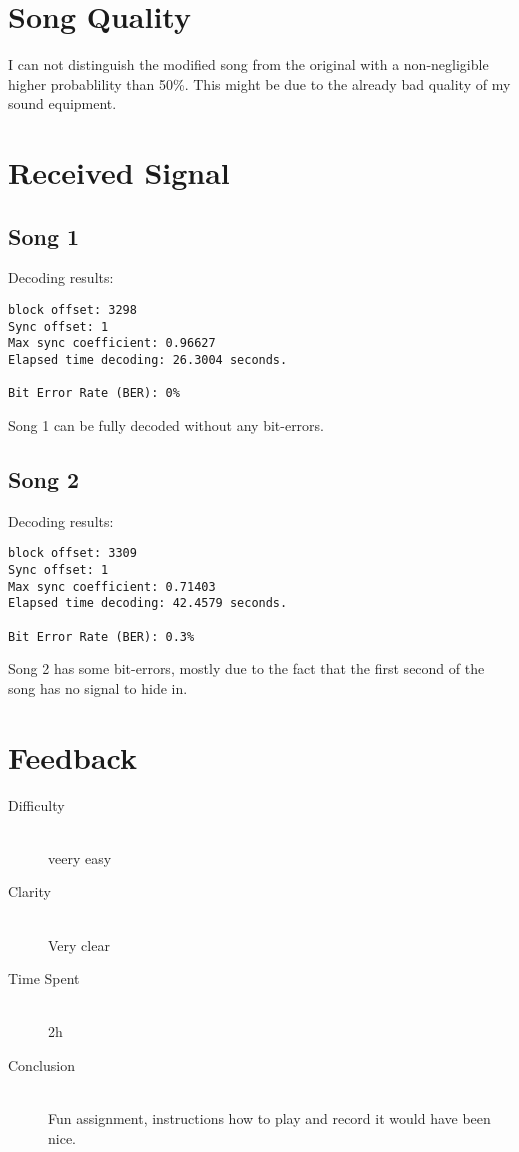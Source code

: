 \documentclass[12pt]{article}
\begin{document}
\section{Song Quality}
I can not distinguish the modified song from the original with a non-negligible higher probablility than 50\%. This might be due to the already bad quality of my sound equipment.

\section{Received Signal}
\subsection{Song 1}
Decoding results:
\begin{verbatim}
block offset: 3298
Sync offset: 1
Max sync coefficient: 0.96627
Elapsed time decoding: 26.3004 seconds.
 
Bit Error Rate (BER): 0%
\end{verbatim}
Song 1 can be fully decoded without any bit-errors.

\subsection{Song 2}
Decoding results:
\begin{verbatim}
block offset: 3309
Sync offset: 1
Max sync coefficient: 0.71403
Elapsed time decoding: 42.4579 seconds.
 
Bit Error Rate (BER): 0.3%
\end{verbatim}
Song 2 has some bit-errors, mostly due to the fact that the first second of the song has no signal to hide in.


\section{Feedback}

\begin{description}
  \item[Difficulty] \hfill \\ veery easy
  \item[Clarity] \hfill \\ Very clear
  \item[Time Spent] \hfill \\  2h
  \item[Conclusion] \hfill \\ Fun assignment, instructions how to play and record it would have been nice.
\end{description}
\end{document}
